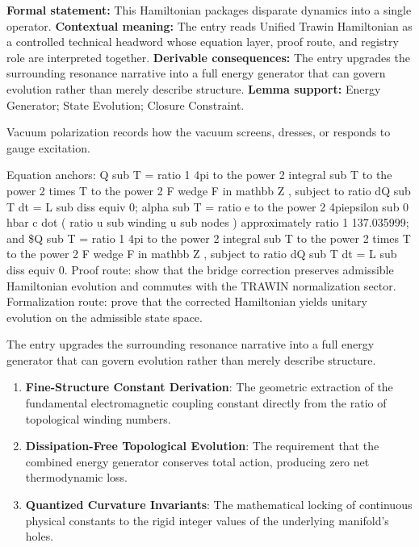 \begingroup\footnotesize\setlength{\emergencystretch}{3em}\sloppy
\textbf{Formal statement:} This Hamiltonian packages disparate dynamics into a single operator. \textbf{Contextual meaning:} The entry reads Unified Trawin Hamiltonian as a controlled technical headword whose equation layer, proof route, and registry role are interpreted together. \textbf{Derivable consequences:} The entry upgrades the surrounding resonance narrative into a full energy generator that can govern evolution rather than merely describe structure. \textbf{Lemma support:} Energy Generator; State Evolution; Closure Constraint.\par
\endgroup

Vacuum polarization records how the vacuum screens, dresses, or responds to gauge excitation.

Equation anchors: Q sub T = ratio 1 4pi to the power 2 integral sub T to the power 2 times T to the power 2 F wedge F in mathbb Z , subject to ratio dQ sub T dt = L sub diss equiv 0; alpha sub T = ratio e to the power 2 4piepsilon sub 0 hbar c dot ( ratio u sub winding u sub nodes ) approximately ratio 1 137.035999; and \$Q sub T = ratio 1 4pi to the power 2 integral sub T to the power 2 times T to the power 2 F wedge F in mathbb Z , subject to ratio dQ sub T dt = L sub diss equiv 0. Proof route: show that the bridge correction preserves admissible Hamiltonian evolution and commutes with the TRAWIN normalization sector. Formalization route: prove that the corrected Hamiltonian yields unitary evolution on the admissible state space.

The entry upgrades the surrounding resonance narrative into a full energy generator that can govern evolution rather than merely describe structure.
\endgroup

\begin{enumerate}[leftmargin=1.6em,itemsep=6pt,topsep=4pt]
\item \textbf{Fine-Structure Constant Derivation}: The geometric extraction of the fundamental electromagnetic coupling constant directly from the ratio of topological winding numbers.
\item \textbf{Dissipation-Free Topological Evolution}: The requirement that the combined energy generator conserves total action, producing zero net thermodynamic loss.
\item \textbf{Quantized Curvature Invariants}: The mathematical locking of continuous physical constants to the rigid integer values of the underlying manifold's holes.
\end{enumerate}


